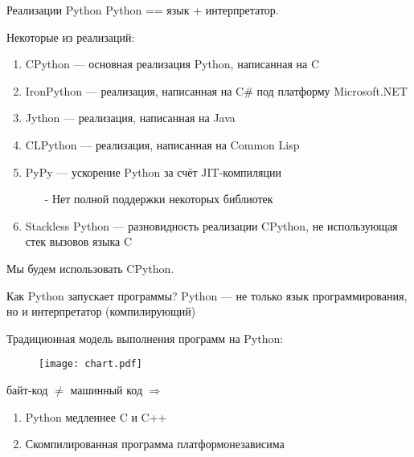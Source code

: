 \documentclass[11pt, fleqn, xcolor=x11names]{beamer}
\begin{document}
\begin{frame}{Реализации Python}
Python == язык + интерпретатор.

Некоторые из реализаций:
\begin{enumerate}
\item CPython --- основная реализация Python, написанная на C

\item IronPython --- реализация, написанная на C\# под платформу Microsoft.NET

\item Jython --- реализация, написанная на Java

\item CLPython --- реализация, написанная на Common Lisp

\item PyPy --- ускорение Python за счёт JIT-компиляции
\begin{itemize}
\item[-] Нет полной поддержки некоторых библиотек
\end{itemize}

\item Stackless Python --- разновидность реализации CPython,
не использующая стек вызовов языка C
\end{enumerate}

\hfill

Мы будем использовать CPython.


\end{frame}
\begin{frame}{Как Python запускает программы?}
Python --- не только язык программирования, но и интерпретатор (компилирующий)

\hfill

Традиционная модель выполнения программ на Python:

\begin{figure}
\texttt{[image: chart.pdf]}
\end{figure}

байт-код $\neq$ машинный код $\Rightarrow$ 
\begin{enumerate}
	\item Python медленнее C и C++
	\item Скомпилированная программа платформонезависима
\end{enumerate}
\end{frame}
\end{document}
